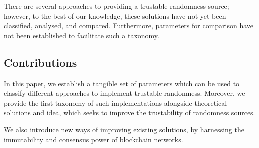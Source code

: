 There are several approaches to providing a trustable randomness source; however, to the best of our knowledge, these solutions have not yet been classified, analysed, and compared.
Furthermore, parameters for comparison have not been established to facilitate such a taxonomy.

\subsection*{Contributions}\label{subsec:contributions}
In this paper, we establish a tangible set of parameters which can be used to classify different approaches to implement trustable randomness.
Moreover, we provide the first taxonomy of such implementations alongside theoretical solutions and idea, which seeks to improve the trustability of randomness sources.

We also introduce new ways of improving existing solutions, by harnessing the immutability and consensus power of blockchain networks.







